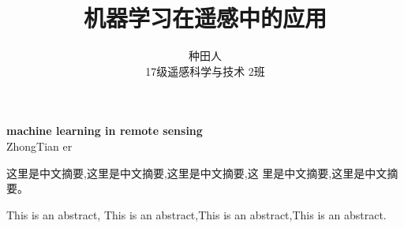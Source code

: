 
\title{\songti \bfseries {} 机器学习在遥感中的应用}
\author{\fangsong {} 种田人 \\ { 17级遥感科学与技术 2班}}
\date{}

\maketitle

\begin{center}
	 {\bfseries machine learning in remote sensing}  \\[0.2pt]
	{ ZhongTian er}
\end{center}

\begin{onecolabstract}
	\vspace{-3em}
	  这里是中文摘要,这里是中文摘要,这里是中文摘要,这
	里是中文摘要,这里是中文摘要。  \\
\end{onecolabstract}
\begin{onecolabstract}
	\vspace{-2.8em}
	 This is an abstract, This is an abstract,This is an 
	abstract,This is an abstract.\\
\end{onecolabstract}